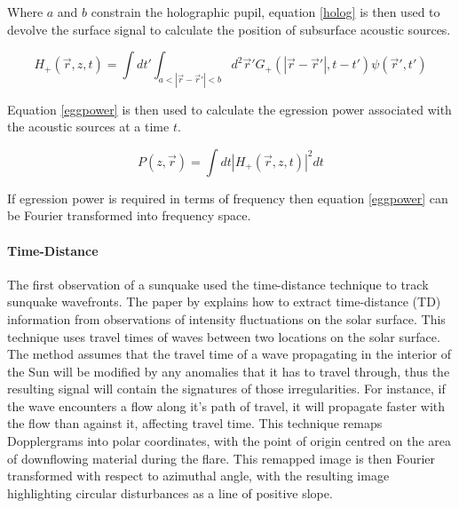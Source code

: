 Where $a$ and $b$ constrain the holographic pupil, equation \ref{holog} is then used to devolve the surface signal to calculate the position of subsurface acoustic sources. 

\begin{equation}\label{holog}
H_{+}(\vec{r},z,t)= \int dt'  \int_{a<|\vec{r}-\vec{r}'|<b} d^{2}\vec{r}'G_{+}(|\vec{r}-\vec{r}'|,t-t')\psi(\vec{r}',t')
\end{equation}

Equation \ref{eggpower} is then used to calculate the egression power associated with the acoustic sources at a time $t$. 

\begin{equation}\label{eggpower}
P(z,\vec{r})=\int dt|H_{+}(\vec{r},z,t)|^{2}dt
\end{equation}

If egression power is required in terms of frequency then equation \ref{eggpower} can be Fourier transformed into frequency space.


\paragraph{Time-Distance}\label{TD}
The first observation of a sunquake \citep{1998Natur.393..317K} used the time-distance technique to track sunquake wavefronts. The paper by \cite{1993Natur.362..430D} explains how to extract time-distance (TD) information from observations of intensity fluctuations on the solar surface. This technique uses travel times of waves between two locations on the solar surface. The method assumes that the travel time of a wave propagating in the interior of the Sun will be modified by any anomalies that it has to travel through, thus the resulting signal will contain the signatures of those irregularities. For instance, if the wave encounters a flow along it's path of travel, it will propagate faster with the flow than against it, affecting travel time.     
This technique remaps Dopplergrams into polar coordinates, with the point of origin centred on the area of downflowing material during the flare. This remapped image is then Fourier transformed with respect to azimuthal angle, with the resulting image highlighting circular disturbances as a line of positive slope.    
